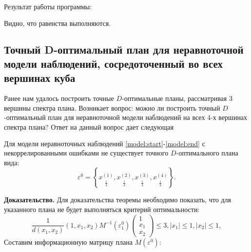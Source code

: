 	Результат работы программы:
	
	
	Видно, что равенства выполняются.
	
\subsection {Точный D-оптимальный план для неравноточной модели наблюдений, сосредоточенный во всех вершинах куба}
	Ранее нам удалось построить точные $D$-оптимальные планы, рассматривая 3 вершины спектра плана. Возникает вопрос: можно ли построить точный $D$-оптимальный план для неравноточной модели наблюдений на всех 4-х вершинах спектра плана? Ответ на данный вопрос дает следующая
	\begin{theorem} \label{theorem-4p}
		Для модели неравноточных наблюдений \eqref{model:start}-\eqref{model:end} с некоррелированными ошибками
		не существует точного $D$-оптимального плана вида:
		\begin{equation}
			\varepsilon^{0} = \left \{
				\underset{\frac 1 4} {x^{(1)}},
				\underset{\frac 1 4} {x^{(2)}},
				\underset{\frac 1 4} {x^{(3)}},
				\underset{\frac 1 4} {x^{(4)}}
			\right \}.
		\end{equation}	 
	\end{theorem}
	\textbf{Доказательство.}
	Для доказательства теоремы необходимо показать, что для указанного плана не будет выполняться критерий оптимальности:
	\begin{equation}\label{theorem-4p:criterion}
		\frac 1 {d(x_1, x_2)}
			(1, x_1, x_2)
			M^{-1}(\varepsilon_1^0)
			\begin{pmatrix}1 \\ x_1 \\ x_2 \end{pmatrix} \le 3,
			|x_1| \le 1, |x_2| \le 1,
	\end{equation}
	Составим информационную матрицу плана $M(\varepsilon^0)$:
